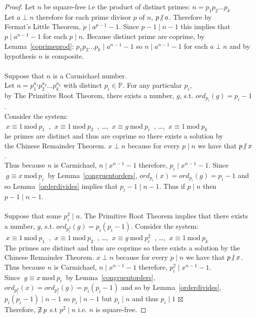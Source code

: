 \documentclass[12pt]{extarticle}
\newcommand{\cont}{$\boxtimes$}
\newcommand{\divides}{\mid}
\newcommand{\ndivides}{\centernot \mid}
\newcommand{\Primes}{\mathbb{P}}
\renewcommand{\mod}[3]{\: #1 \equiv #2 \: \mathrm{mod} \: #3 \:}
\begin{document}
\begin{proof}
Let $n$ be square-free i.e the product of distinct primes: $n = p_1   p_2   \dots   p_k$ \\ Let $a \perp n$ therefore for each prime divisor $p$ of $n$, $p \ndivides a$. Therefore by \\ Fermat's Little Theorem, $p \divides a^{p-1} - 1$. Since $p - 1 \divides n-1$ this implies that $p \divides a^{n-1} - 1$ for each $p \divides n$.
Because distinct prime are coprime, by Lemma~\ref{coprimeprod}: $p_1   p_2   \dots   p_k \divides a^{n-1} - 1$ so $n \divides a^{n-1} - 1$ for each $a \perp n$ and by hypothesis $n$ is composite.
\\\\
Suppose that $n$ is a Carmichael number. \\
Let $n = p_1^{a_1}   p_2^{a_2}   \dots   p_k^{a_k}$ with distinct $p_i \in \Primes$. For any particular $p_i$, \\
by The Primitive Root Theorem, there exists a number, $g$, s.t. $ord_{p_i}(g) = p_i-1$. \\ 
Consider the system: 
\\ \indent $\mod{x}{1}{p_1}$ , $\mod{x}{1}{p_2}$ , \dots ,  $\mod{x}{g}{p_i}$ , \dots , $\mod{x}{1}{p_k}$\\ he primes are distinct and thus are coprime so there exists a solution by \\ the Chinese Remainder Theorem. $x \perp n$ because for every $p \divides n$ we have that $p \ndivides x$. \\
Thus because $n$ is Carmichael, $n \divides x^{n-1} - 1$ therefore, $p_i \divides x^{n-1} - 1$. Since $\mod{g}{x}{p_i}$ by Lemma~\ref{congruentorders}, $ord_{p_i}(x) = ord_{p_i}(g) = p_i-1$ and so Lemma~\ref{orderdivides} implies that $p_i - 1 \divides n - 1$.
Thus if $p \divides n$ then $p-1 \divides n-1$. \\\\

\noindent Suppose that some $p_i^2 \divides n$. The Primitive Root Theorem implies that there exists a number, $g$, s.t. $ord_{p_i^2}(g) = p_i(p_i-1)$. Consider the system: \\ \indent $\mod{x}{1}{p_1}$ , $\mod{x}{1}{p_2}$ , \dots ,  $\mod{x}{g}{p_i^2}$ , \dots , $\mod{x}{1}{p_k}$\\ The primes are distinct and thus are coprime so there exists a solution by the Chinese Remainder Theorem. $x \perp n$ because for every $p \divides n$ we have that $p \ndivides x$. \\
Thus because $n$ is Carmichael, $n \divides x^{n-1} - 1$ therefore, $p_i^2 \divides x^{n-1} - 1$. \\ Since $\mod{g}{x}{p_i}$ by Lemma~\ref{congruentorders}, $ord_{p_i^2}(x) = ord_{p_i^2}(g) = p_i(p_i-1)$ and so by Lemma~\ref{orderdivides}, $p_i(p_i - 1) \divides n - 1$ so $p_i \divides n-1$ but $p_i \divides n$ and thus $p_i \divides 1$ \cont \\ Therefore, $\centernot \exists p$ s.t $p^2 \divides n$ i.e. $n$ is square-free. 
\end{proof}
\end{document}
